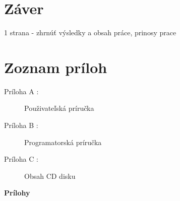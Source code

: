 \chapter*{Záver}


1 strana - zhrnúť výsledky a obsah práce, prinosy prace

\clearpage

\renewcommand{\bibsection}{\chapter{Zoznam použitej literatúry}}
\nocite{*}  %
\printbibliography[title=Zoznam použitej literatúry]

\clearpage
\cleardoublepage
\chapter*{Zoznam príloh}

\begin{description}
\item[Príloha A : ] Použivateľská príručka
\item[Príloha B : ] Programatorská príručka
\item[Príloha C : ] Obsah CD disku
\end{description}


\cleardoublepage
{}


\begin{titlepage}
    \begin{center}
		\vspace*{10cm}
		\Huge \textbf{Prílohy}
    \end{center}
\end{titlepage}
\setcounter{page}{2}
\appendix
\cleardoublepage

\titleformat{\subsection}{\Large\bf}{\textcolor{black}{#1}}{0pt}{}
\clearpage

